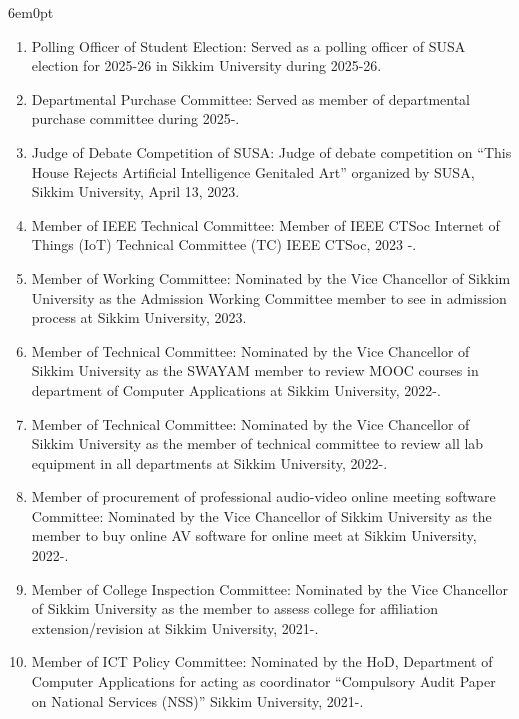 \documentclass[11pt,a4paper]{moderncv}
\begin{document}
\begin{adjustwidth}{6em}{0pt}
	\begin{enumerate}
		

		\item Polling Officer of Student Election: Served as a polling officer of SUSA election for 2025-26 in Sikkim University during 2025-26.
		
		\item Departmental Purchase Committee: Served as member of departmental purchase committee during 2025-.
		
		\item Judge of Debate Competition of SUSA: Judge of debate competition on “This House Rejects Artificial Intelligence Genitaled Art” organized by SUSA, Sikkim University, April 13, 2023.
		
		\item Member of IEEE Technical Committee: Member of IEEE CTSoc Internet of Things (IoT) Technical Committee (TC) IEEE CTSoc, 2023 -.
		
		\item Member of Working Committee: Nominated by the Vice Chancellor of Sikkim University as the Admission Working Committee member to see in admission process at Sikkim University, 2023.
		
		\item Member of Technical Committee: Nominated by the Vice Chancellor of Sikkim University as the SWAYAM member to review MOOC courses in department of Computer Applications at Sikkim University, 2022-.
		
		\item Member of Technical Committee: Nominated by the Vice Chancellor of Sikkim University as the member of technical committee to review all lab equipment in all departments at Sikkim University, 2022-.
		
		\item Member of procurement of professional audio-video online meeting software Committee: Nominated by the Vice Chancellor of Sikkim University as the member to buy online AV software for online meet at Sikkim University, 2022-.
		
		\item Member of College Inspection Committee: Nominated by the Vice Chancellor of Sikkim University as the member to assess college for affiliation extension/revision at Sikkim University, 2021-.
		
		\item Member of ICT Policy Committee: Nominated by the HoD, Department of Computer Applications for acting as coordinator “Compulsory Audit Paper on National Services (NSS)” Sikkim University, 2021-.
		

\end{enumerate}
\end{adjustwidth}
\end{document}
